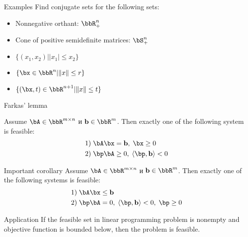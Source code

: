\documentclass[12pt]{beamer}
\begin{document}
\begin{frame}{Examples}
Find conjugate sets for the following sets:
\begin{itemize}
\item Nonnegative orthant: $\bbR^n_+$
\item Cone of positive semidefinite matrices: $\bS^n_+$
\item $\{ (x_1, x_2) | |x_1| \leq x_2 \}$
\item $\{ \bx \in \bbR^n | \| x \| \leq r \}$
\item $\{ (\bx, t) \in \bbR^{n+1} | \| x \| \leq t \}$
\end{itemize}
\end{frame}

\begin{frame}{Farkas' lemma}
\scriptsize
\begin{lemma}[Farkas]
Assume $\bA \in \bbR^{m \times n}$ и $\mathbf{b} \in \bbR^m$. Then exactly one of the following system is feasible:
\vspace{-4mm}
\begin{equation*}
\begin{split}
1)& \; \bA\bx = \mathbf{b}, \; \bx \geq 0\\
2)& \; \bp\bA \geq 0, \; \langle \bp, \mathbf{b} \rangle < 0
\end{split}
\end{equation*}
\end{lemma}

\begin{block}{Important corollary}
Assume $\bA \in \bbR^{m \times n}$ и $\mathbf{b} \in \bbR^m$. Then exactly one of the following systems is feasible:
\vspace{-4mm}
\begin{equation*}
\begin{split}
1)& \; \bA\bx \leq \mathbf{b}\\
2)& \; \bp\bA = 0, \; \langle \bp, \mathbf{b} \rangle < 0, \; \bp \geq 0
\end{split}
\end{equation*}
\end{block}

\begin{block}{Application}
If the feasible set in linear programming problem is nonempty and objective function is bounded below, then the problem is feasible.
\end{block}

\end{frame}
\end{document}
